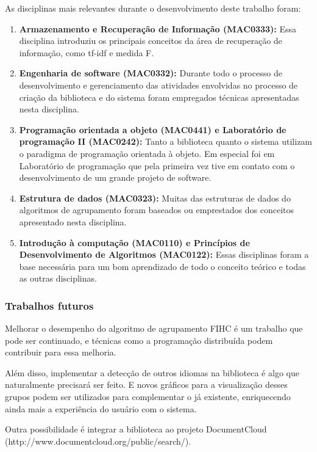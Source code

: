 \documentclass[a4paper,12pt]{article}
\begin{document}
As disciplinas mais relevantes durante o desenvolvimento deste trabalho foram:
\begin{enumerate}
    \item \textbf{Armazenamento e Recuperação de Informação (MAC0333):} Essa disciplina introduziu os principais conceitos da área de recuperação de informação, como tf-idf e medida F.

    \item \textbf{Engenharia de software (MAC0332):} Durante todo o processo de desenvolvimento e gerenciamento das atividades envolvidas no processo de criação da biblioteca e do sistema foram empregados técnicas apresentadas nesta disciplina.

    \item \textbf{Programação orientada a objeto (MAC0441) e Laboratório de programação II (MAC0242):} Tanto a biblioteca quanto o sistema utilizam o paradigma de programação orientada à objeto. Em especial foi em Laboratório de programação que pela primeira vez tive em contato com o desenvolvimento de um grande projeto de software.

    \item \textbf{Estrutura de dados (MAC0323):} Muitas das estruturas de dados do algoritmos de agrupamento foram baseados ou emprestados dos conceitos apresentado nesta disciplina.

    \item \textbf{Introdução à computação (MAC0110) e Princípios de Desenvolvimento de Algoritmos (MAC0122):} Essas disciplinas foram a base necessária para um bom aprendizado de todo o conceito teórico e todas as outras disciplinas.
\end {enumerate}

\subsubsection {Trabalhos futuros}
\label {sec:trabalhos_futuros}

Melhorar o desempenho do algoritmo de agrupamento FIHC é um trabalho que pode ser continuado, e técnicas como a programação distribuída podem contribuir para essa melhoria.

Além disso, implementar a detecção de outros idiomas na biblioteca é algo que naturalmente precisará ser feito. E novos gráficos para a visualização desses grupos podem ser utilizados para complementar o já existente, enriquecendo ainda mais a experiência do usuário com o sistema.

Outra possibilidade é integrar a biblioteca ao projeto DocumentCloud (http://www.documentcloud.org/public/search/).
\end{document}
